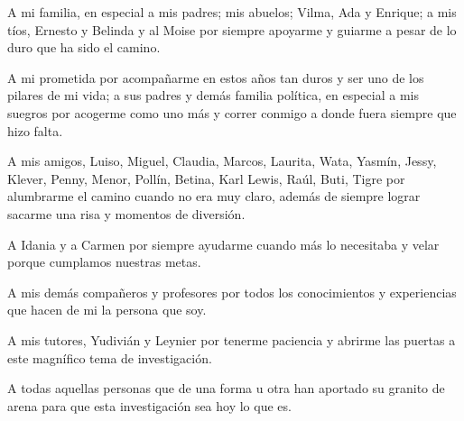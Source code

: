 \begin{acknowledgements}
	A mi familia, en especial a mis padres; mis abuelos; Vilma, Ada y Enrique; a mis tíos, Ernesto y Belinda y al Moise por siempre apoyarme y guiarme a pesar de lo duro que ha sido el camino.\vspace{10 pt}
	
	
	A mi prometida por acompañarme en estos años tan duros y ser uno de los pilares de mi vida; a sus padres y demás familia política, en especial a mis suegros por acogerme como uno más y correr conmigo a donde fuera siempre que hizo falta.\vspace{10 pt}
	
	
	A mis amigos, Luiso, Miguel, Claudia, Marcos, Laurita, Wata, Yasmín, Jessy, Klever, Penny, Menor, Pollín, Betina, Karl Lewis, Raúl, Buti, Tigre por alumbrarme el camino cuando no era muy claro, además de siempre lograr sacarme una risa y momentos de diversión. \vspace{10 pt}	
	
	A Idania y a Carmen por siempre ayudarme cuando más lo necesitaba y velar porque cumplamos nuestras metas.\vspace{10 pt}
	
	A mis demás compañeros y profesores por todos los conocimientos y experiencias que hacen de mi la persona que soy.\vspace{10 pt}
	
	
	A mis tutores, Yudivián y Leynier por tenerme paciencia y abrirme las puertas a este magnífico tema de investigación.\vspace{10 pt}
	
	
	A todas aquellas personas que de una forma u otra han aportado su granito de arena para que esta investigación sea hoy lo que es.
\end{acknowledgements}